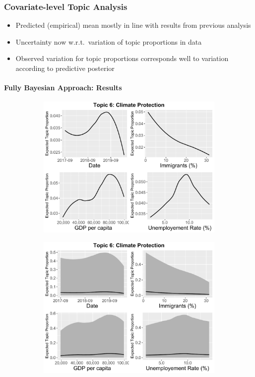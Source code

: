 \documentclass[xcolor=dvipsnames]{beamer}
\begin{document}
\begin{frame}
\frametitle{Covariate-level Topic Analysis}
\begin{itemize}
\item Predicted (empirical) mean mostly in line with results from previous analysis
\item Uncertainty now w.r.t.\ variation of topic proportions in data
\item Observed variation for topic proportions corresponds well to variation according to predictive posterior
\end{itemize}
\framesubtitle{Fully Bayesian Approach: Results}
\begin{figure}[h!]
  \centering
  \captionsetup{justification=centering}
  \begin{subfigure}[b]{0.4\linewidth}
    \includegraphics[width=\linewidth]{../../plots/presentation/stanbeta_t6_without_credible.pdf}
  \end{subfigure}
  \begin{subfigure}[b]{0.4\linewidth}
    \includegraphics[width=\linewidth]{../../plots/presentation/stanbeta_t6_with_credible.pdf}

\end{subfigure}
\end{figure}
\end{frame}
\end{document}
